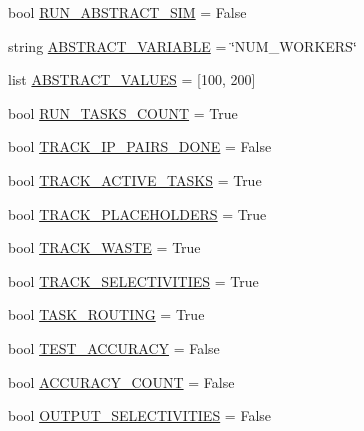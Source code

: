 \begin{DoxyCompactItemize}
\item 
bool \hyperlink{namespacedynamicfilterapp_1_1toggles_a73b7b22a82dc40407d03e22dca8ac257}{R\+U\+N\+\_\+\+A\+B\+S\+T\+R\+A\+C\+T\+\_\+\+S\+IM} = False
\item 
string \hyperlink{namespacedynamicfilterapp_1_1toggles_a05ba5c39ee5a05284597d091b01650a3}{A\+B\+S\+T\+R\+A\+C\+T\+\_\+\+V\+A\+R\+I\+A\+B\+LE} = \char`\"{}N\+U\+M\+\_\+\+W\+O\+R\+K\+E\+RS\char`\"{}
\item 
list \hyperlink{namespacedynamicfilterapp_1_1toggles_ab64c8432c11e4b89425ac1f220ca01a9}{A\+B\+S\+T\+R\+A\+C\+T\+\_\+\+V\+A\+L\+U\+ES} = \mbox{[}100, 200\mbox{]}
\item 
bool \hyperlink{namespacedynamicfilterapp_1_1toggles_a904bebe166c12146cac5f4dec979450c}{R\+U\+N\+\_\+\+T\+A\+S\+K\+S\+\_\+\+C\+O\+U\+NT} = True
\item 
bool \hyperlink{namespacedynamicfilterapp_1_1toggles_ac1bb03e2d3e1f9304e6628d802795547}{T\+R\+A\+C\+K\+\_\+\+I\+P\+\_\+\+P\+A\+I\+R\+S\+\_\+\+D\+O\+NE} = False
\item 
bool \hyperlink{namespacedynamicfilterapp_1_1toggles_a9c5fce243b39b491bbdf705555a92617}{T\+R\+A\+C\+K\+\_\+\+A\+C\+T\+I\+V\+E\+\_\+\+T\+A\+S\+KS} = True
\item 
bool \hyperlink{namespacedynamicfilterapp_1_1toggles_a2be074e9eca6d662578ca68c95050ad3}{T\+R\+A\+C\+K\+\_\+\+P\+L\+A\+C\+E\+H\+O\+L\+D\+E\+RS} = True
\item 
bool \hyperlink{namespacedynamicfilterapp_1_1toggles_ab80874aebf30b9d13f7928d5ecbd6ae2}{T\+R\+A\+C\+K\+\_\+\+W\+A\+S\+TE} = True
\item 
bool \hyperlink{namespacedynamicfilterapp_1_1toggles_acc098c8abb66db6192e90e5b54413c39}{T\+R\+A\+C\+K\+\_\+\+S\+E\+L\+E\+C\+T\+I\+V\+I\+T\+I\+ES} = True
\item 
bool \hyperlink{namespacedynamicfilterapp_1_1toggles_a267ac7f08878f62c6031a8fb38aa695b}{T\+A\+S\+K\+\_\+\+R\+O\+U\+T\+I\+NG} = True
\item 
bool \hyperlink{namespacedynamicfilterapp_1_1toggles_a899bd5bdb20b1d0a0592390572cc4e87}{T\+E\+S\+T\+\_\+\+A\+C\+C\+U\+R\+A\+CY} = False
\item 
bool \hyperlink{namespacedynamicfilterapp_1_1toggles_ae898ca1b1c4681151406ecc2921a738b}{A\+C\+C\+U\+R\+A\+C\+Y\+\_\+\+C\+O\+U\+NT} = False
\item 
bool \hyperlink{namespacedynamicfilterapp_1_1toggles_ac8f124f313b63d29e1664ff5fc7a049f}{O\+U\+T\+P\+U\+T\+\_\+\+S\+E\+L\+E\+C\+T\+I\+V\+I\+T\+I\+ES} = False
\item 

\end{DoxyCompactItemize}
